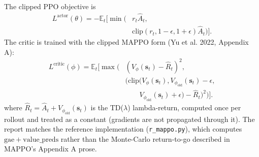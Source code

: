 \documentclass[conference]{IEEEtran}
\begin{document}
The clipped PPO objective is
\begin{equation}
\begin{aligned}
L^{\mathrm{actor}}(\theta)=-\mathbb E_t\big[\min(&r_t\widehat A_t,\\
&\mathrm{clip}(r_t,1-\epsilon,1+\epsilon)\widehat A_t)\big].
\end{aligned}
\label{eq:actorloss}
\end{equation}
The critic is trained with the clipped MAPPO form (Yu et al. 2022, Appendix A):
\begin{equation}
\begin{aligned}
L^{\mathrm{critic}}(\phi)=\mathbb E_t\Big[\max\big(&
(V_\phi(\mathbf s_t)-\widehat R_t)^2,\;\\[-1mm]
&(\mathrm{clip}(V_\phi(\mathbf s_t),
V_{\phi_{\mathrm{old}}}(\mathbf s_t)-\epsilon,\\[-1mm]
&\qquad V_{\phi_{\mathrm{old}}}(\mathbf s_t)+\epsilon)
-\widehat R_t)^2\big)\Big].
\end{aligned}
\label{eq:criticloss}
\end{equation}
where $\widehat R_t=\widehat A_t+V_{\phi_{\mathrm{old}}}(\mathbf s_t)$ is the TD($\lambda$) lambda-return, computed once per rollout and treated as a constant (gradients are not propagated through it). The report matches the reference implementation (\texttt{r\_mappo.py}), which computes $\mathrm{gae}+\mathrm{value\_preds}$ rather than the Monte-Carlo return-to-go described in MAPPO's Appendix A prose.
\end{document}
